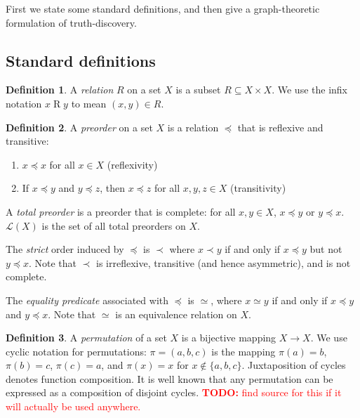 \documentclass{article}
\theoremstyle{definition} \newtheorem{definition}{Definition}
\theoremstyle{definition} \newtheorem{example}{Example}
\theoremstyle{plain} \newtheorem{axiom}{Axiom}
\theoremstyle{plain} \newtheorem*{remark}{Remark}
\theoremstyle{remark} \newtheorem*{notation}{Notation}
\theoremstyle{plain} \newtheorem{lemma}{Lemma}
\theoremstyle{plain} \newtheorem{proposition}{Proposition}
\newcommand{\todo}[1] {
    \textcolor{red}{
        \textbf{TODO:} #1
    }
}
\newcommand{\orderings}{\mathcal{L}}
\begin{document}
First we state some standard definitions, and then give a graph-theoretic
formulation of truth-discovery.

\subsection{Standard definitions}

\begin{definition}
A \emph{relation} $R$ on a set $X$ is a subset $R \subseteq X \times X$. We
use the infix notation $x \mathbin{R} y$ to mean $(x, y) \in R$.
\end{definition}

\begin{definition}
A \emph{preorder} on a set $X$ is a relation $\preceq$ that is reflexive and
transitive:
\begin{enumerate}
\item $x \preceq x$ for all $x \in X$ (reflexivity)
\item If $x \preceq y$ and $y \preceq z$, then $x \preceq z$ for all $x, y, z
\in X$ (transitivity)
\end{enumerate}

A \emph{total preorder} is a preorder that is complete: for all $x, y \in X$,
$x \preceq y$ or $y \preceq x$. $\orderings(X)$ is the set of all total
preorders on $X$.

The \emph{strict} order induced by $\preceq$ is $\prec$ where $x \prec y$ if
and only if $x \preceq y$ but not $y \preceq x$. Note that $\prec$ is
irreflexive, transitive (and hence asymmetric), and is not complete.

The \emph{equality predicate} associated with $\preceq$ is $\simeq$, where $x
\simeq y$ if and only if $x \preceq y$ and $y \preceq x$. Note that $\simeq$ is
an equivalence relation on $X$.

\end{definition}

\begin{definition}
A \emph{permutation} of a set $X$ is a bijective mapping $X \rightarrow X$. We
use cyclic notation for permutations: $\pi=(a, b, c)$ is the mapping $\pi(a) =
b$, $\pi(b) = c$, $\pi(c) = a$, and $\pi(x) = x$ for $x \notin \{a, b, c\}$.
Juxtaposition of cycles denotes function composition. It is well known that any
permutation can be expressed as a composition of disjoint cycles.\todo{find
source for this if it will actually be used anywhere.}
\end{definition}
\end{document}
